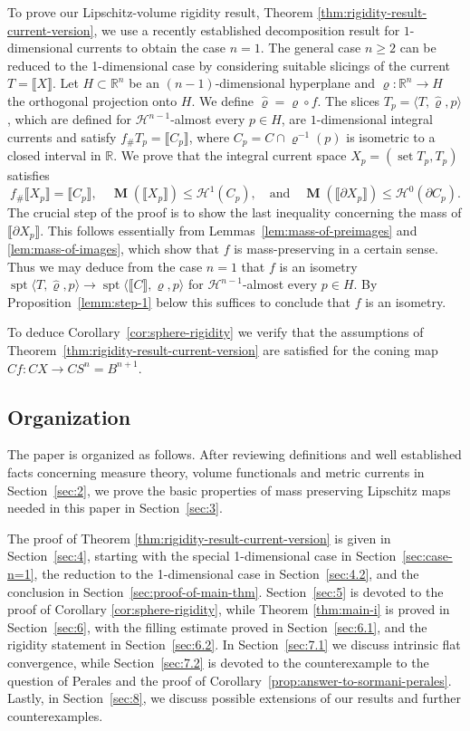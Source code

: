 \documentclass[reqno]{amsart}
\numberwithin{equation}{section}
\newcommand{\R}{\mathbb{R}}
\newcommand{\Ha}{\mathcal{H}}
\newcommand{\spt}{\operatorname{spt}}
\newcommand{\bb}[1]{\llbracket #1\rrbracket}
\newcommand{\susbet}{\subset}
\DeclareMathOperator{\mass}{\mathbf{M}}
\DeclareMathOperator{\set}{set}
\renewcommand{\rho}{\varrho}
\begin{document}
To prove our Lipschitz-volume rigidity result, Theorem \ref{thm:rigidity-result-current-version}, we use a recently established decomposition result for $1$-dimensional currents \cite{Bonicatto-Del-Nin-Pasqualetto-2022} to obtain the case $n=1$. The general case \(n\geq 2\) can be  reduced to the 1-dimensional case by considering suitable slicings of the current \(T=\bb{X}\). Let \(H\susbet \R^n\) be an \((n-1)\)-dimensional hyperplane and \(\rho \colon \R^n \to H\) the orthogonal projection onto \(H\). We define \(\widehat{\rho}=\rho \circ f\). The slices \(T_p=\langle T, \widehat{\rho}, p \rangle\),
which are defined for \(\Ha^{n-1}\)-almost every \(p\in H\), are \(1\)-dimensional integral currents and satisfy \(f_\# T_p =\bb{C_p}\), where \(C_p= C \cap \rho^{-1}(p)\) is isometric to a closed interval in \(\R\). We prove that the integral current space \(X_p=(\set T_p, T_p)\) satisfies 
\[
f_\# \bb{X_p}=\bb{C_p}, \quad \mass(\bb{X_p})\leq \Ha^{1}(C_p), \quad \text{and} \quad \mass(\bb{\partial X_p})\leq \Ha^{0}(\partial C_p).
\]
The crucial step of the proof is to show the last inequality concerning the mass of \(\bb{\partial X_p}\). This follows essentially from Lemmas~\ref{lem:mass-of-preimages} and \ref{lem:mass-of-images}, which show that \(f\) is mass-preserving in a certain sense. Thus we may deduce from the case $n=1$ that \(f\) is an isometry $\spt \langle T ,\widehat{\rho}, p \rangle \to \spt \langle \bb{C} ,\rho,p \rangle$ for \(\Ha^{n-1}\)-almost every \(p\in H\).  By Proposition~\ref{lemm:step-1} below this suffices to conclude that \(f\) is an isometry.

To deduce Corollary~\ref{cor:sphere-rigidity} we verify that the assumptions of Theorem~\ref{thm:rigidity-result-current-version} are satisfied for the coning map $Cf\colon CX\to C S^n=B^{n+1}$.

\subsection{Organization}The paper is organized as follows. After reviewing definitions and well established facts concerning measure theory, volume functionals and metric currents in Section~\ref{sec:2}, we prove the basic properties of mass preserving Lipschitz maps needed in this paper in Section~\ref{sec:3}. 

The proof of Theorem \ref{thm:rigidity-result-current-version} is given in Section~\ref{sec:4}, starting with the special 1-dimensional case in Section~\ref{sec:case-n=1}, the reduction to the 1-dimensional case in Section~\ref{sec:4.2}, and the conclusion in Section~\ref{sec:proof-of-main-thm}. Section~\ref{sec:5} is devoted to the proof of Corollary \ref{cor:sphere-rigidity}, while Theorem \ref{thm:main-i} is proved in Section~\ref{sec:6}, with the filling estimate proved in Section~\ref{sec:6.1}, and the rigidity statement in Section~\ref{sec:6.2}. In Section~\ref{sec:7.1} we discuss intrinsic flat convergence, while Section~\ref{sec:7.2} is devoted to the counterexample to the question of Perales and the proof of Corollary~\ref{prop:answer-to-sormani-perales}. Lastly, in Section~\ref{sec:8}, we discuss possible extensions of our results and further counterexamples.
\end{document}

